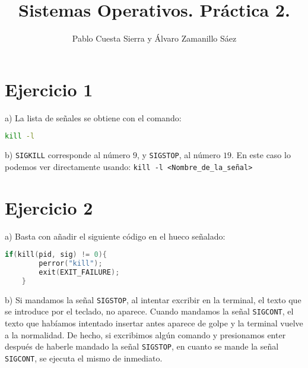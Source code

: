 \documentclass{article}
\begin{document}
\title{Sistemas Operativos. Práctica 2.}
\author{Pablo Cuesta Sierra y Álvaro Zamanillo Sáez}
\maketitle

\begin{tcolorbox}
\tableofcontents
\end{tcolorbox}



\section*{Ejercicio 1}
a) La lista de señales se obtiene con el comando: 

\begin{lstlisting}[language=bash, 
                   backgroundcolor=\color{black},
                   keywordstyle=\color{green},
                   basicstyle=\ttfamily\footnotesize\color{white}]
kill -l
\end{lstlisting}

b) \texttt{SIGKILL} corresponde al número $9$, y \texttt{SIGSTOP}, al número $19$. En este caso lo podemos ver directamente usando: \texttt{kill -l <Nombre\_de\_la\_señal>}

\section*{Ejercicio 2}

a) Basta con añadir el siguiente código en el hueco señalado: 


\begin{lstlisting}[language=C, frame=single]
    if(kill(pid, sig) != 0){
        perror("kill");
        exit(EXIT_FAILURE);
    }
\end{lstlisting}

b) Si mandamos la señal \texttt{SIGSTOP}, al intentar excribir en la terminal, el texto que se introduce por el teclado, no aparece. Cuando mandamos la señal \texttt{SIGCONT}, el texto que habíamos intentado insertar antes aparece de golpe y la terminal vuelve a la normalidad.
De hecho, si excribimos algún comando y presionamos enter después de haberle mandado la señal \texttt{SIGSTOP}, en cuanto se mande la señal \texttt{SIGCONT}, se ejecuta el mismo de inmediato.

\end{document}
